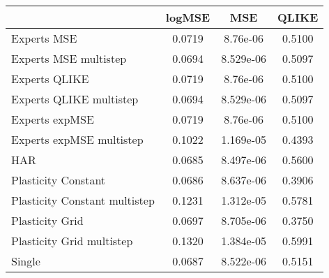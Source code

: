 
\begin{tabular}{l|c|c|c}
    & logMSE & MSE & QLIKE \\\hline
Experts MSE & 0.0719 & 8.76e-06 & 0.5100\\ 
Experts MSE multistep & 0.0694 & 8.529e-06 & 0.5097\\ 
Experts QLIKE & 0.0719 & 8.76e-06 & 0.5100\\ 
Experts QLIKE multistep & 0.0694 & 8.529e-06 & 0.5097\\ 
Experts expMSE & 0.0719 & 8.76e-06 & 0.5100\\ 
Experts expMSE multistep & 0.1022 & 1.169e-05 & 0.4393\\ 
HAR & 0.0685 & 8.497e-06 & 0.5600\\ 
Plasticity Constant & 0.0686 & 8.637e-06 & 0.3906\\ 
Plasticity Constant multistep & 0.1231 & 1.312e-05 & 0.5781\\ 
Plasticity Grid & 0.0697 & 8.705e-06 & 0.3750\\ 
Plasticity Grid multistep & 0.1320 & 1.384e-05 & 0.5991\\ 
Single & 0.0687 & 8.522e-06 & 0.5151\\ 
\end{tabular}